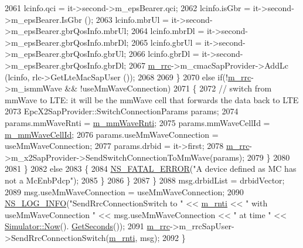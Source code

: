 \begin{DoxyCode}
2061           lcinfo.qci =   it->second->m\_epsBearer.qci;
2062           lcinfo.isGbr = it->second->m\_epsBearer.IsGbr ();
2063           lcinfo.mbrUl = it->second->m\_epsBearer.gbrQosInfo.mbrUl;
2064           lcinfo.mbrDl = it->second->m\_epsBearer.gbrQosInfo.mbrDl;
2065           lcinfo.gbrUl = it->second->m\_epsBearer.gbrQosInfo.gbrUl;
2066           lcinfo.gbrDl = it->second->m\_epsBearer.gbrQosInfo.gbrDl;
2067           \hyperlink{classns3_1_1UeManager_ab4405e9f354c66e7c1a4c95832290f5b}{m\_rrc}->m\_cmacSapProvider->AddLc (lcinfo, rlc->GetLteMacSapUser ());
2068 
2069         \}
2070         \textcolor{keywordflow}{else} \textcolor{keywordflow}{if}(!\hyperlink{classns3_1_1UeManager_ab4405e9f354c66e7c1a4c95832290f5b}{m\_rrc}->m\_ismmWave && !useMmWaveConnection)
2071         \{
2072           \textcolor{comment}{// switch from mmWave to LTE: it will be the mmWave cell that forwards the data back to LTE}
2073           EpcX2SapProvider::SwitchConnectionParams params;
2074           params.mmWaveRnti = \hyperlink{classns3_1_1UeManager_a3d5cf7dc8a13b9e2616ecb9a70faebd3}{m\_mmWaveRnti};
2075           params.mmWaveCellId = \hyperlink{classns3_1_1UeManager_a0f53cb816bd8a3ad6227dc9adca671b2}{m\_mmWaveCellId};
2076           params.useMmWaveConnection = useMmWaveConnection;
2077           params.drbid = it->first;
2078           \hyperlink{classns3_1_1UeManager_ab4405e9f354c66e7c1a4c95832290f5b}{m\_rrc}->m\_x2SapProvider->SendSwitchConnectionToMmWave(params);
2079         \}
2080 
2081       \}     
2082       \textcolor{keywordflow}{else}
2083       \{
2084         \hyperlink{group__fatal_ga5131d5e3f75d7d4cbfd706ac456fdc85}{NS\_FATAL\_ERROR}(\textcolor{stringliteral}{"A device defined as MC has not a McEnbPdcp"});
2085       \}
2086     \}
2087   \}
2088   msg.drbidList = drbidVector;
2089   msg.useMmWaveConnection = useMmWaveConnection;
2090   \hyperlink{group__logging_gafbd73ee2cf9f26b319f49086d8e860fb}{NS\_LOG\_INFO}(\textcolor{stringliteral}{"SendRrcConnectionSwitch to "} << \hyperlink{classns3_1_1UeManager_a5a72b4fe818f21993bd7f05d7e2c4f83}{m\_rnti} << \textcolor{stringliteral}{" with useMmWaveConnection "} << 
      msg.useMmWaveConnection << \textcolor{stringliteral}{" at time "} << \hyperlink{classns3_1_1Simulator_ac3178fa975b419f7875e7105be122800}{Simulator::Now}().
      \hyperlink{classns3_1_1Time_a8f20d5c3b0902d7b4320982f340b57c8}{GetSeconds}());
2091   \hyperlink{classns3_1_1UeManager_ab4405e9f354c66e7c1a4c95832290f5b}{m\_rrc}->m\_rrcSapUser->SendRrcConnectionSwitch(\hyperlink{classns3_1_1UeManager_a5a72b4fe818f21993bd7f05d7e2c4f83}{m\_rnti}, msg);  
2092 \}
\end{DoxyCode}


